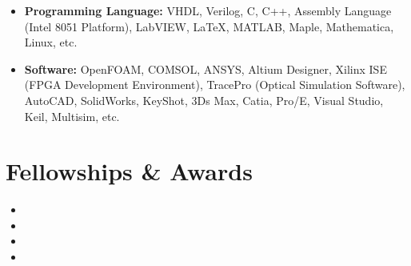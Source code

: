 \documentclass[11pt,a4paper,sans]{moderncv}         %
\begin{document}
\begin{itemize}

	\item \textbf{Programming Language:} VHDL, Verilog, C, C++, Assembly Language (Intel 8051 Platform), LabVIEW, \LaTeX, MATLAB, Maple, Mathematica, Linux, etc.

	      \vspace{2pt}

	\item \textbf{Software:} OpenFOAM, COMSOL, ANSYS, Altium Designer, Xilinx ISE (FPGA Development Environment), TracePro (Optical Simulation Software), AutoCAD, SolidWorks, KeyShot, 3Ds Max, Catia, Pro/E, Visual Studio, Keil, Multisim, etc.

\end{itemize}

\section{Fellowships \& Awards}

\vspace{3pt}

\begin{itemize}

	\item{}

	\item{}

	\item{}

	\item{}

\end{itemize}
\end{document}
